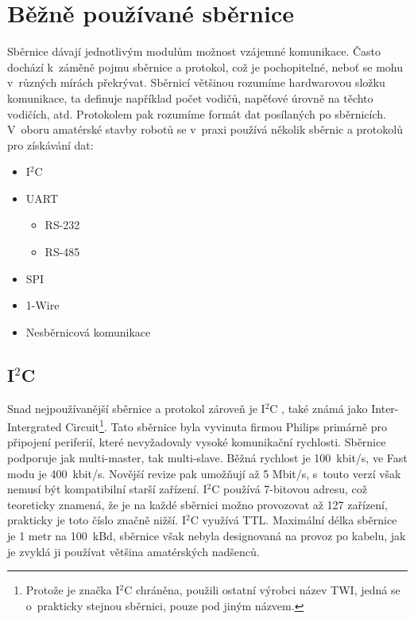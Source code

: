 \chapter{Běžně používané sběrnice}
Sběrnice dávají jednotlivým modulům možnost vzájemné komunikace.
Často dochází k~záměně pojmu sběrnice a protokol, což je pochopitelné, neboť se mohu v~různých mírách překrývat.
Sběrnicí většinou rozumíme hardwarovou složku komunikace, ta definuje například počet vodičů, napěťové úrovně na těchto vodičích, atd.
Protokolem pak rozumíme formát dat posílaných po sběrnicích.
V~oboru amatérské stavby robotů se v~praxi používá několik sběrnic a protokolů pro získávání dat:
\begin{itemize}
	\item I$^{2}$C
	\item UART
	      \begin{itemize}
		      \item RS-232
		      \item RS-485
	      \end{itemize}
	\item SPI
	\item 1-Wire
	\item Nesběrnicová komunikace
\end{itemize}

\section{I$^{2}$C}
Snad nejpoužívanější sběrnice a protokol zároveň je I$^{2}$C \cite{nxp:UM10204},
také známá jako Inter-Intergrated Circuit\footnote{ Protože je značka I$^{2}$C chráněna, použili ostatní výrobci název TWI, jedná se o~prakticky stejnou sběrnici, pouze pod jiným názvem.}.
Tato sběrnice byla vyvinuta firmou Philips primárně pro připojení periferií, které nevyžadovaly vysoké komunikační rychlosti.
Sběrnice podporuje jak multi-master, tak multi-slave.
Běžná rychlost je 100~kbit/s, ve Fast modu je 400~kbit/s. Novější revize pak umožňují až 5 Mbit/s, s~touto verzí však nemusí být kompatibilní starší zařízení.
I$^{2}$C používá 7-bitovou adresu, což teoreticky znamená, že je na každé sběrnici možno provozovat až 127 zařízení, prakticky je toto číslo značně nižší.
I$^{2}$C využívá TTL.
Maximální délka sběrnice je 1 metr na 100~kBd, sběrnice však nebyla designovaná na provoz po kabelu, jak je zvyklá ji používat většina amatérských nadšenců.


